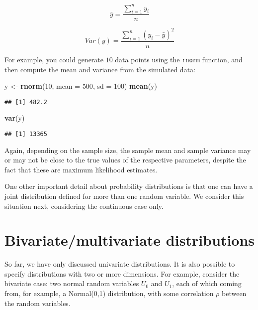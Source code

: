\documentclass[12pt,]{krantz}
\newenvironment{Shaded}{\begin{snugshade}}{\end{snugshade}}
\newcommand{\DataTypeTok}[1]{\textcolor[rgb]{0.13,0.29,0.53}{#1}}
\newcommand{\DecValTok}[1]{\textcolor[rgb]{0.00,0.00,0.81}{#1}}
\newcommand{\KeywordTok}[1]{\textcolor[rgb]{0.13,0.29,0.53}{\textbf{#1}}}
\newcommand{\NormalTok}[1]{#1}
\newcommand{\StringTok}[1]{\textcolor[rgb]{0.31,0.60,0.02}{#1}}
\begin{document}
\begin{equation}
\bar{y} =  \frac{\sum_{i=1}^n y_i}{n} 
\end{equation}

\begin{equation}
Var(y) = \frac{\sum_{i=1}^n (y_i-
\bar{y})^2}{n}
\end{equation}

For example, you could generate \(10\) data points using the \texttt{rnorm} function, and then compute the mean and variance from the simulated data:

\begin{Shaded}
\begin{Highlighting}[]
\NormalTok{y <-}\StringTok{ }\KeywordTok{rnorm}\NormalTok{(}\DecValTok{10}\NormalTok{, }\DataTypeTok{mean =} \DecValTok{500}\NormalTok{, }\DataTypeTok{sd =} \DecValTok{100}\NormalTok{)}
\KeywordTok{mean}\NormalTok{(y)}
\end{Highlighting}
\end{Shaded}

\begin{verbatim}
## [1] 482.2
\end{verbatim}

\begin{Shaded}
\begin{Highlighting}[]
\KeywordTok{var}\NormalTok{(y)}
\end{Highlighting}
\end{Shaded}

\begin{verbatim}
## [1] 13365
\end{verbatim}

Again, depending on the sample size, the sample mean and sample variance may or may not be close to the true values of the respective parameters, despite the fact that these are maximum likelihood estimates.

One other important detail about probability distributions is that one can have a joint distribution defined for more than one random variable. We consider this situation next, considering the continuous case only.

\hypertarget{bivariatemultivariate-distributions}{%
\section{Bivariate/multivariate distributions}\label{bivariatemultivariate-distributions}}

So far, we have only discussed univariate distributions. It is also possible to specify distributions with two or more dimensions. For example, consider the bivariate case:
two normal random variables \(U_0\) and \(U_1\), each of which coming from, for example, a Normal(0,1) distribution, with some correlation \(\rho\) between the random variables.
\end{document}
